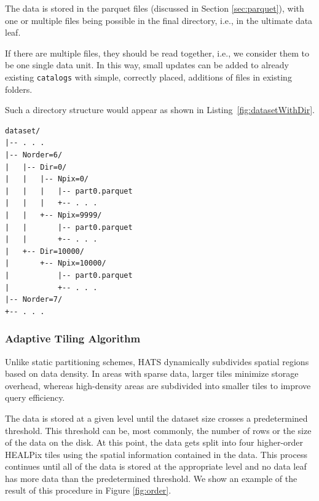 \documentclass[11pt,a4paper]{ivoa}
\begin{document}
The data is stored in the parquet files (discussed in Section \ref{sec:parquet}), with one or multiple files being possible in the final directory, i.e., in the ultimate data leaf.  \par 
If there are multiple files, they should be read together, i.e., we consider them to be one single data unit. 
In this way, small updates can be added to already existing  \texttt{catalogs} with simple, correctly placed, additions of files in existing folders.

Such a directory structure would appear as shown in Listing~\ref{fig:datasetWithDir}.

\begin{minipage}{\linewidth}
\begin{lstlisting}[caption=Example catalog dataset directory contents with leaf directories, label=fig:datasetWithDir]
dataset/
|-- . . .
|-- Norder=6/
|   |-- Dir=0/
|   |   |-- Npix=0/
|   |   |   |-- part0.parquet
|   |   |   +-- . . .
|   |   +-- Npix=9999/
|   |       |-- part0.parquet
|   |       +-- . . .
|   +-- Dir=10000/
|       +-- Npix=10000/
|           |-- part0.parquet
|           +-- . . .
|-- Norder=7/
+-- . . .
\end{lstlisting} 
\end{minipage} 

\subsubsection{Adaptive Tiling Algorithm} \label{sec:adaptive}
Unlike static partitioning schemes, HATS dynamically subdivides spatial regions based on data density. 
In areas with sparse data, larger tiles minimize storage overhead, whereas high-density areas are subdivided into smaller tiles to improve query efficiency. \par

The data is stored at a given level until the dataset size crosses a predetermined threshold. 
This threshold can be, most commonly, the number of rows or the size of the data on the disk. 
At this point, the data gets split into four higher-order HEALPix tiles using the spatial information contained in the data. 
This process continues until all of the data is stored at the appropriate level and no data leaf has more data than the predetermined threshold. We show an example of the result of this procedure in Figure \ref{fig:order}.
\end{document}
